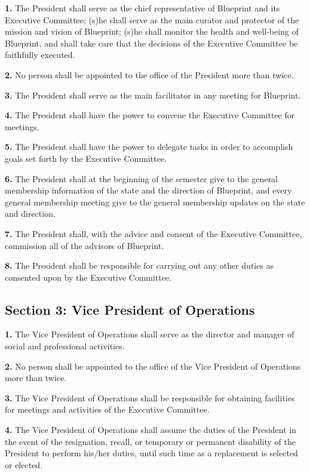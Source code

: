\documentclass{article}
\begin{document}
\textbf{1.} The President shall serve as the chief representative of Blueprint and its Executive Committee; (s)he shall serve as the main curator and protector of the mission and vision of Blueprint; (s)he shall monitor the health and well-being of Blueprint, and shall take care that the decisions of the Executive Committee be faithfully executed.

\textbf{2.} No person shall be appointed to the office of the President more than twice.

\textbf{3.} The President shall serve as the main facilitator in any meeting for Blueprint.

\textbf{4.} The President shall have the power to convene the Executive Committee for meetings.

\textbf{5.} The President shall have the power to delegate tasks in order to accomplish goals set forth by the Executive Committee.

\textbf{6.} The President shall at the beginning of the semester give to the general membership information of the state and the direction of Blueprint, and every general membership meeting give to the general membership updates on the state and direction.

\textbf{7.} The President shall, with the advice and consent of the Executive Committee, commission all of the advisors of Blueprint.

\textbf{8.} The President shall be responsible for carrying out any other duties as consented upon by the Executive Committee.

\subsection{Section 3: Vice President of Operations}

\textbf{1.} The Vice President of Operations shall serve as the director and manager of social and professional activities.

\textbf{2.} No person shall be appointed to the office of the Vice President of Operations more than twice.

\textbf{3.} The Vice President of Operations shall be responsible for obtaining facilities for meetings and activities of the Executive Committee.

\textbf{4.} The Vice President of Operations shall assume the duties of the President in the event of the resignation, recall, or temporary or permanent disability of the President to perform his/her duties, until such time as a replacement is selected or elected.
\end{document}
